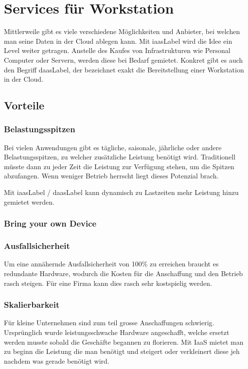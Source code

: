 \section{Services für Workstation}
Mittlerweile gibt es viele verschiedene Möglichkeiten und Anbieter, bei welchen man seine Daten in der Cloud ablegen kann. Mit \Gls{iaasLabel} wird die Idee ein Level weiter getragen. 
Anstelle des Kaufes von Infrastrukturen wie Personal Computer oder Servern, werden diese bei Bedarf gemietet.
Konkret gibt es auch den Begriff \Gls{daasLabel}, der bezeichnet exakt die Bereitstellung einer Workstation in der Cloud.

\subsection{Vorteile}
\subsubsection{Belastungsspitzen}
Bei vielen Anwendungen gibt es tägliche, saisonale, jährliche oder andere Belastungsspitzen, zu welcher zusätzliche Leistung benötigt wird. 
Traditionell müsste dann zu jeder Zeit die Leistung zur Verfügung stehen, um die Spitzen abzufangen. Wenn weniger Betrieb herrscht liegt dieses Potenzial brach.

Mit \Gls{iaasLabel} / \Gls{daasLabel} kann dynamisch zu Lastzeiten mehr Leistung hinzu gemietet werden.

\subsubsection{Bring your own Device}


\subsubsection{Ausfallsicherheit}
Um eine annähernde Ausfallsicherheit von 100\% zu erreichen braucht es redundante Hardware, wodurch die Kosten für die Anschaffung und den Betrieb rasch steigen.
Für eine Firma kann dies rasch sehr kostspielig werden.

\subsubsection{Skalierbarkeit}
Für kleine Unternehmen sind zum teil grosse Anschaffungen schwierig. 
Ursprünglich wurde leistungsschwache Hardware angeschafft, welche ersetzt werden musste sobald die Geschäfte begannen zu florieren. 
Mit IaaS mietet man zu beginn die Leistung die man benötigt und steigert oder verkleinert diese jeh nachdem was gerade benötigt wird.


